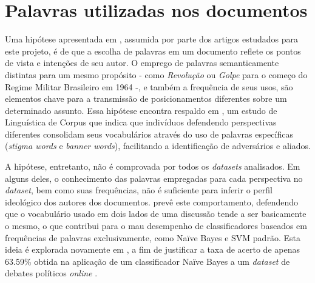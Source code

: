 \section{Palavras utilizadas nos documentos}

Uma hipótese apresentada em \cite{lin-et-al2006}, assumida por parte dos artigos estudados para este projeto, é de que a escolha de palavras em um documento reflete os pontos de vista e intenções de seu autor. O emprego de palavras semanticamente distintas para um mesmo propósito - como \emph{Revolução} ou \emph{Golpe} para o começo do Regime Militar Brasileiro em 1964 -, e também a frequência de seus usos, são elementos chave para a transmissão de posicionamentos diferentes sobre um determinado assunto. %
Essa hipótese encontra respaldo em \cite{teubert2001}, um estudo de Linguística de Corpus \cite{biber-d1998}\cite{halliday2004} que indica que indivíduos defendendo perspectivas diferentes consolidam seus vocabulários através do uso de palavras específicas (\emph{stigma words} e \emph{banner words}), facilitando a identificação de adversários e aliados. 

A hipótese, entretanto, não é comprovada por todos os \emph{datasets} analisados. Em alguns deles, o conhecimento das palavras empregadas para cada perspectiva no \emph{dataset}, bem como suas frequências, não é suficiente para inferir o perfil ideológico dos autores dos documentos. \cite{agrawal2003} prevê este comportamento, defendendo que o vocabulário usado em dois lados de uma discussão tende a ser basicamente o mesmo, o que contribui para o mau desempenho de classificadores baseados em frequências de palavras exclusivamente, como Naïve Bayes e SVM padrão. Esta ideia é explorada novamente em \cite{malouf-taking_sides}, a fim de justificar a taxa de acerto de apenas 63.59\% obtida na aplicação de um classificador Naïve Bayes a um \emph{dataset} de debates políticos \emph{online} \cite{www-politics-org}.

